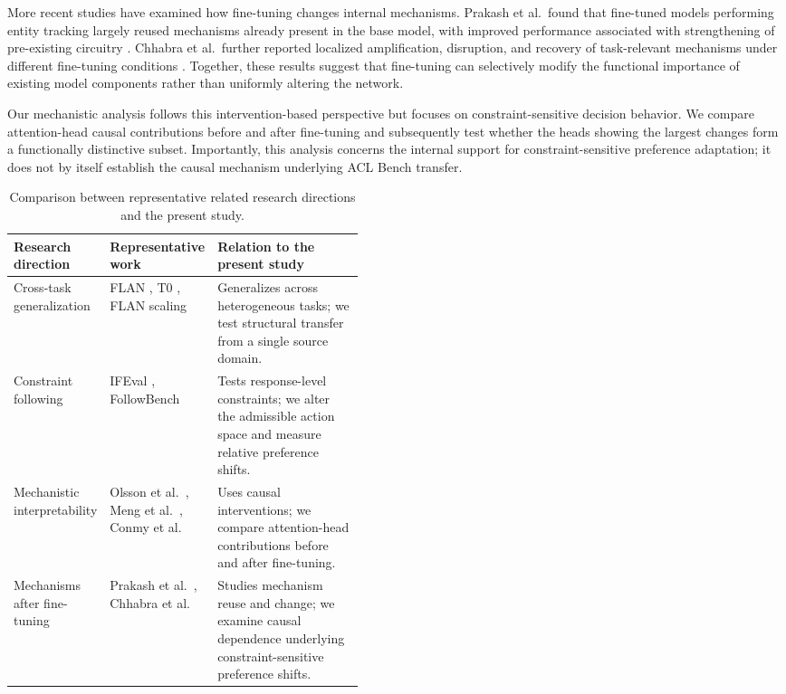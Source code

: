 More recent studies have examined how fine-tuning changes internal mechanisms. Prakash et al.\ found that fine-tuned models performing entity tracking largely reused mechanisms already present in the base model, with improved performance associated with strengthening of pre-existing circuitry \cite{prakash2024finetuning}. Chhabra et al.\ further reported localized amplification, disruption, and recovery of task-relevant mechanisms under different fine-tuning conditions \cite{chhabra2025neuroplasticity}. Together, these results suggest that fine-tuning can selectively modify the functional importance of existing model components rather than uniformly altering the network.

Our mechanistic analysis follows this intervention-based perspective but focuses on constraint-sensitive decision behavior. We compare attention-head causal contributions before and after fine-tuning and subsequently test whether the heads showing the largest changes form a functionally distinctive subset. Importantly, this analysis concerns the internal support for constraint-sensitive preference adaptation; it does not by itself establish the causal mechanism underlying ACL Bench transfer.

\begin{table}[ht]
\centering
\small
\caption{Comparison between representative related research directions and the present study.}
\label{tab:related_work_comparison}
\begin{tabularx}{\linewidth}{@{}
>{\raggedright\arraybackslash}p{0.18\linewidth}
>{\raggedright\arraybackslash}p{0.27\linewidth}
>{\raggedright\arraybackslash}X@{}}
\toprule
\rowcolor{NeutralCell}
\textbf{Research direction} &
\textbf{Representative work} &
\textbf{Relation to the present study} \\
\midrule

Cross-task generalization &
FLAN \cite{wei2022finetuned}, T0 \cite{sanh2022multitask}, FLAN scaling \cite{chung2024scaling} &
Generalizes across heterogeneous tasks; we test structural transfer from a single source domain. \\

Constraint following &
IFEval \cite{zhou2023ifeval}, FollowBench \cite{jiang2024followbench} &
Tests response-level constraints; we alter the admissible action space and measure relative preference shifts. \\

Mechanistic interpretability &
Olsson et al.\ \cite{olsson2022induction}, Meng et al.\ \cite{meng2022locating}, Conmy et al.\ \cite{conmy2023automated} &
Uses causal interventions; we compare attention-head contributions before and after fine-tuning. \\

Mechanisms after fine-tuning &
Prakash et al.\ \cite{prakash2024finetuning}, Chhabra et al.\ \cite{chhabra2025neuroplasticity} &
Studies mechanism reuse and change; we examine causal dependence underlying constraint-sensitive preference shifts. \\

\bottomrule
\end{tabularx}
\end{table}

